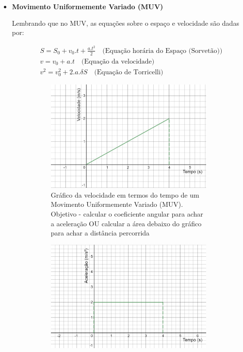 \documentclass[12pt]{extarticle}
\newcommand{\<}{\langle}
\renewcommand{\>}{\rangle}
\theoremstyle{definition}
\begin{document}
\begin{itemize}
\item \textbf{Movimento Uniformemente Variado (MUV)}

Lembrando que no MUV, as equações sobre o espaço e velocidade são dadas por:

\begin{align}
    &S = S_0 +v_0.t + \frac{a.t^2}{2}\quad\text{(Equação horária do Espaço (Sorvetão))}\\
    &v= v_0 + a.t \quad\text{(Equação da velocidade)}\\ 
    &v^2 = v_0^2 + 2.a.\delta S \quad\text{(Equação de Torricelli)}
\end{align}
        \begin{figure}[H]
    \centering
    \begin{subfigure}[b]{0.4\textwidth}
         \centering
         \includegraphics[width=\textwidth]{MUV_vel.png}
         \caption{Gráfico da velocidade em termos do tempo de um Movimento Uniformemente Variado (MUV). Objetivo - calcular o coeficiente angular para achar a aceleração OU calcular a área debaixo do gráfico para achar a distância percorrida}
         \label{fig:MUV_vel}
     \end{subfigure}
     \hfill
     \begin{subfigure}[b]{0.4\textwidth}
         \centering
         \includegraphics[width=\textwidth]{aceleracao_MUV.png}

\end{subfigure}
\end{figure}
\end{itemize}
\end{document}
